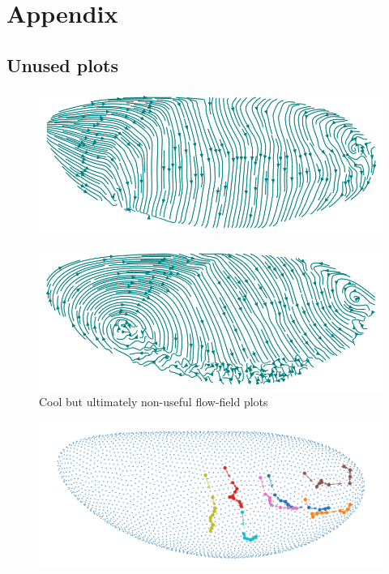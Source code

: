 \chapter*{Appendix}
\section{Unused plots}
\label{App:Plots}
\begin{figure}[H]
    \centering
    \includegraphics[width=1\linewidth]{chapters/Appendix/streamplot1.png}
\end{figure}
\begin{figure}[H]
    \centering
    \includegraphics[width=1\linewidth]{chapters/Appendix/streamplot2.png}
    \caption{Cool but ultimately non-useful flow-field plots}
    \label{fig:enter-label}
\end{figure}

\begin{figure}[H]
    \centering
    \includegraphics[width=1\linewidth]{chapters/Results/figures/movements.png}
    \caption{}
    \label{fig:GBMovements}
\end{figure}

